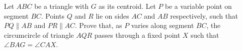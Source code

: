 Let $ ABC$ be a triangle with $ G$ as its centroid. Let $ P$ be a variable point on segment $ BC$. Points $ Q$ and $ R$ lie on sides $ AC$ and $ AB$ respectively, such that $ PQ \parallel AB$ and $ PR \parallel AC$. Prove that, as $ P$ varies along segment $ BC$, the circumcircle of triangle $ AQR$ passes through a fixed point $ X$ such that $ \angle BAG = \angle CAX$.